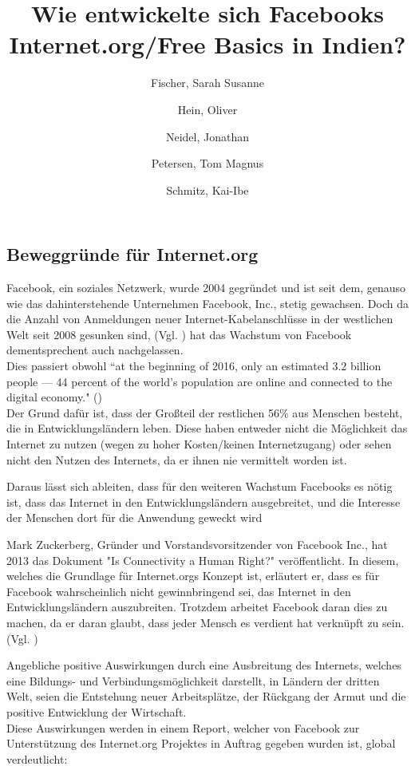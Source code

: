 \documentclass{article}
\title{Wie entwickelte sich Facebooks Internet.org/Free Basics in Indien?}
\author{
  Fischer, Sarah Susanne\\
  \and
  Hein, Oliver\\
  \and
  Neidel, Jonathan\\
  \and
  Petersen, Tom Magnus\\
  \and
  Schmitz, Kai-Ibe\\
}
\begin{document}
\subsection{Beweggründe für Internet.org}
Facebook, ein soziales Netzwerk, wurde 2004 gegründet und ist seit dem, genauso wie das dahinterstehende Unternehmen Facebook, Inc., stetig gewachsen. 
Doch da die Anzahl von Anmeldungen neuer Internet-Kabelanschlüsse in der westlichen Welt seit 2008 gesunken sind,
(Vgl. \cite{ICTslowingDown}) hat das Wachstum von Facebook dementsprechent auch nachgelassen.\\
Dies passiert obwohl ``at the beginning of 2016, only an estimated 3.2 billion people — 44 percent of the world’s population are online and connected to the digital economy." (\cite{connectWorld})\\
Der Grund dafür ist, dass der Großteil der restlichen 56\% aus Menschen besteht, die in Entwicklungsländern leben. Diese haben entweder nicht die Möglichkeit das Internet zu nutzen (wegen zu hoher Kosten/keinen Internetzugang) oder sehen nicht den Nutzen des Internets, da er ihnen nie vermittelt worden ist.

\medskip

Daraus lässt sich ableiten, dass für den weiteren Wachstum Facebooks es nötig ist, dass das Internet in den Entwicklungsländern ausgebreitet, und die Interesse der Menschen dort für die Anwendung geweckt wird

\medskip
Mark Zuckerberg, Gründer und Vorstandsvorsitzender von Facebook Inc., hat 2013 das Dokument "Is Connectivity a Human Right?" veröffentlicht.
In diesem, welches die Grundlage für Internet.orgs Konzept ist, erläutert er, dass es für Facebook wahrscheinlich nicht gewinnbringend sei, das Internet in den Entwicklungsländern auszubreiten. Trotzdem arbeitet Facebook daran dies zu machen, da er daran glaubt, dass jeder Mensch es verdient hat verknüpft zu sein.(Vgl. \cite{HumanRight})

\medskip

Angebliche positive Auswirkungen durch eine Ausbreitung des Internets, welches eine Bildungs- und Verbindungsmöglichkeit darstellt, in Ländern der dritten Welt, seien die Entstehung neuer Arbeitsplätze, der Rückgang der Armut und die positive Entwicklung der Wirtschaft.\\
    
Diese Auswirkungen werden in einem Report, welcher von Facebook zur Unterstützung des Internet.org Projektes in Auftrag gegeben wurden ist, global verdeutlicht:
                    
\end{document}
